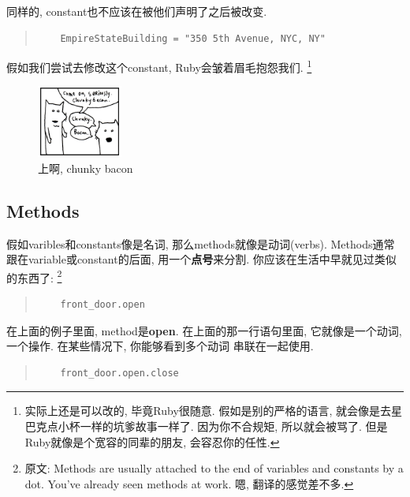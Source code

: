 同样的, constant也不应该在被他们声明了之后被改变. 

\begin{quotation}
  \begin{verbatim}
    EmpireStateBuilding = "350 5th Avenue, NYC, NY"
  \end{verbatim}
\end{quotation}

假如我们尝试去修改这个constant, Ruby会皱着眉毛抱怨我们. 
\footnote{实际上还是可以改的, 毕竟Ruby很随意. 假如是别的严格的语言, 就会像是去星巴克点小杯一样的坑爹故事一样了. 因为你不合规矩, 所以就会被骂了. 但是Ruby就像是个宽容的同辈的朋友, 会容忍你的任性. }

\begin{figure}[h]
  \centering
  \includegraphics[width=0.25\textwidth]{image/why/foxes-4d.png}
  \caption{上啊, chunky bacon}
\end{figure}

\subsection*{Methods}
假如varibles和constants像是名词, 那么methods就像是动词(verbs). 
Methods通常跟在variable或constant的后面, 用一个\textbf{点号}来分割. 
你应该在生活中早就见过类似的东西了: 
\footnote{原文: Methods are usually attached to the end of variables and constants by a dot. You've already seen methods at work. 嗯, 翻译的感觉差不多. }

\begin{quotation}
  \begin{verbatim}
    front_door.open
  \end{verbatim}
\end{quotation}

在上面的例子里面, method是\textbf{open}. 在上面的那一行语句里面, 
它就像是一个动词, 一个操作. 在某些情况下, 你能够看到多个动词
串联在一起使用. 

\begin{quotation}
  \begin{verbatim}
    front_door.open.close
  \end{verbatim}
\end{quotation}


